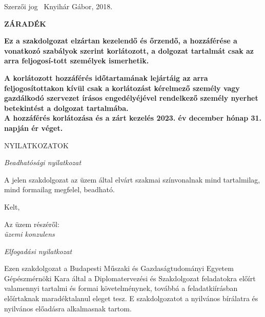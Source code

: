\newpage\null\thispagestyle{empty}
\newpage\thispagestyle{empty}
Szerzői jog \textcopyright ~Knyihár Gábor, 2018.\\[2cm]

\begin{center}
    \bf ZÁRADÉK
\end{center}


{\bf Ez a szakdolgozat elzártan kezelendő és őrzendő, a hozzáférése a vonatkozó szabályok szerint korlátozott, a dolgozat tartalmát csak az arra feljogosí-tott személyek ismerhetik.}

{\bf A korlátozott hozzáférés időtartamának lejártáig az arra feljogosítottakon kívül csak a korlátozást kérelmező személy vagy gazdálkodó szervezet írásos engedélyéjével rendelkező személy nyerhet betekintést a dolgozat tartalmába.}\\[0.5cm]

{\bf A hozzáférés korlátozása és a zárt kezelés 2023. év december hónap 
31. napján ér véget.}

\newpage\null\thispagestyle{empty}
\newpage\thispagestyle{empty}

%

\newpage\null\thispagestyle{empty}
\newpage\thispagestyle{plain}
\begin{center}
    \Large \MakeUppercase{Nyilatkozatok}
\end{center}

{\centering \itshape Beadhatósági nyilatkozat \par}
A jelen szakdolgozat az üzem által elvárt szakmai színvonalnak mind tartalmilag, mind formailag megfelel, beadható.

Kelt, 

{\hspace{0.4\textwidth} Az üzem részéről:}\\[1cm]

{\hspace{0.6\textwidth} \itshape üzemi konzulens}\\[0.1cm]

{\centering \itshape Elfogadási nyilatkozat \par}
Ezen szakdolgozat a Budapesti Műszaki és Gazdaságtudományi Egyetem Gépészmérnöki Kara által a Diplomatervezési és Szakdolgozat feladatokra előírt valamennyi tartalmi és formai követelménynek, továbbá a feladatkiírásban előírtaknak maradéktalanul eleget tesz. E szakdolgozatot a nyilvános bírálatra és nyilvános előadásra alkalmasnak tartom. 

